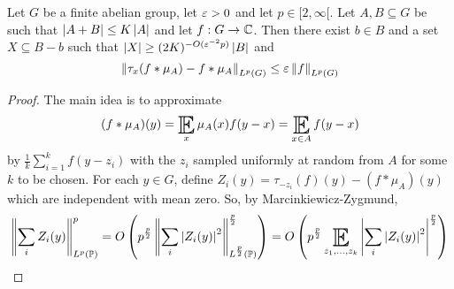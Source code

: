 \documentclass{article}
\begin{document}
\begin{nthm}
  Let $G$ be a finite abelian group, let $\varepsilon > 0$ and let $p \in [2, \infty[$. Let $A, B \subseteq G$ be such that $\left\lvert A + B\right\rvert \le K\left\lvert A\right\rvert$ and let $f : G \to \mathbb C$. Then there exist $b \in B$ and a set $X \subseteq B - b$ such that $\left\lvert X\right\rvert \ge (2K)^{-O(\varepsilon^{-2}p)}\left\lvert B\right\rvert$ and
  $$\left\lVert \tau_x(f \ast \mu_A) - f \ast \mu_A\right\rVert_{L^p(G)} \le \varepsilon \left\lVert f\right\rVert_{L^p(G)}$$
\end{nthm}
\begin{proof}
  The main idea is to approximate
  $$(f \ast \mu_A)(y) = \E_x \mu_A(x) f(y - x) = \E_{x \in A} f(y - x)$$
  by $\frac 1k \sum_{i = 1}^k f(y - z_i)$ with the $z_i$ sampled uniformly at random from $A$ for some $k$ to be chosen. For each $y \in G$, define $Z_i(y) = \tau_{-z_i}(f)(y) - (f \ast \mu_A)(y)$ which are independent with mean zero. So, by Marcinkiewicz-Zygmund,
  $$\norm{\sum_i Z_i(y)}_{L^p(\P)}^p = O\left(p^{\frac p2} \norm{\sum_i \abs{Z_i(y)}^2}_{L^{\frac p2}(\P)}^{\frac p2}\right) = O\left(p^{\frac p2} \E_{z_1, \dots, z_k} \abs{\sum_i \abs{Z_i(y)}^2}^{\frac p2}\right)$$

  \newlec
  

\end{proof}
\end{document}
